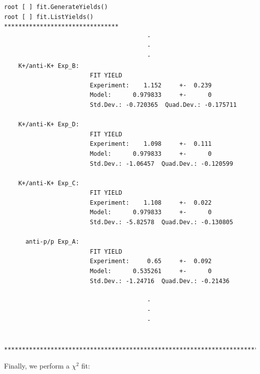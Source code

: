 \documentclass{elsarticle}
\begin{document}
\small
\begin{verbatim}
root [ ] fit.GenerateYields()
root [ ] fit.ListYields()
********************************
                                        -
                                        -
                                        -
    K+/anti-K+ Exp_B:
                        FIT YIELD
                        Experiment:    1.152     +-  0.239
                        Model:      0.979833     +-      0
                        Std.Dev.: -0.720365  Quad.Dev.: -0.175711

    K+/anti-K+ Exp_D:
                        FIT YIELD
                        Experiment:    1.098     +-  0.111
                        Model:      0.979833     +-      0
                        Std.Dev.: -1.06457  Quad.Dev.: -0.120599

    K+/anti-K+ Exp_C:
                        FIT YIELD
                        Experiment:    1.108     +-  0.022
                        Model:      0.979833     +-      0
                        Std.Dev.: -5.82578  Quad.Dev.: -0.130805

      anti-p/p Exp_A:
                        FIT YIELD
                        Experiment:     0.65     +-  0.092
                        Model:      0.535261     +-      0
                        Std.Dev.: -1.24716  Quad.Dev.: -0.21436

                                        -
                                        -
                                        -

  ******************************************************************************

\end{verbatim}
\normalsize

Finally, we perform a $\chi^2$ fit:
\end{document}
